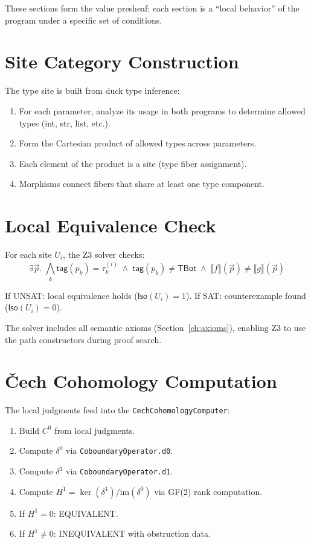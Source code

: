 \documentclass[11pt,a4paper]{report}
\theoremstyle{definition}
\theoremstyle{plain}
\newcommand{\den}[1]{\llbracket #1 \rrbracket}
\newcommand{\Iso}{\mathsf{Iso}}
\newcommand{\Hone}{H^1}
\begin{document}
These sections form the value presheaf: each section is a
``local behavior'' of the program under a specific set of conditions.

\section{Site Category Construction}

The type site is built from duck type inference:
\begin{enumerate}
  \item For each parameter, analyze its usage in both programs to
    determine allowed types (int, str, list, etc.).
  \item Form the Cartesian product of allowed types across parameters.
  \item Each element of the product is a site (type fiber assignment).
  \item Morphisms connect fibers that share at least one type component.
\end{enumerate}

\section{Local Equivalence Check}

For each site $U_i$, the Z3 solver checks:
\[
  \exists \vec{p}.\; \bigwedge_k \mathsf{tag}(p_k) = \tau_k^{(i)}
  \;\land\; \mathsf{tag}(p_k) \neq \mathsf{TBot}
  \;\land\; \den{f}(\vec{p}) \neq \den{g}(\vec{p})
\]

If UNSAT: local equivalence holds ($\Iso(U_i) = 1$).
If SAT: counterexample found ($\Iso(U_i) = 0$).

The solver includes all semantic axioms (Section~\ref{ch:axioms}),
enabling Z3 to use the path constructors during proof search.

\section{\v{C}ech Cohomology Computation}

The local judgments feed into the \texttt{CechCohomologyComputer}:
\begin{enumerate}
  \item Build $C^0$ from local judgments.
  \item Compute $\delta^0$ via \texttt{CoboundaryOperator.d0}.
  \item Compute $\delta^1$ via \texttt{CoboundaryOperator.d1}.
  \item Compute $\Hone = \ker(\delta^1) / \mathrm{im}(\delta^0)$
    via GF(2) rank computation.
  \item If $\Hone = 0$: EQUIVALENT.
  \item If $\Hone \neq 0$: INEQUIVALENT with obstruction data.
\end{enumerate}
\end{document}

